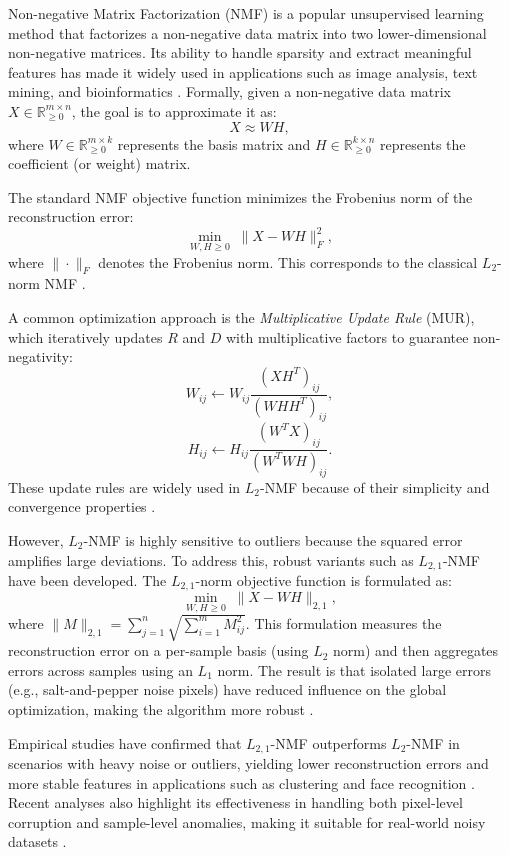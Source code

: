 
\noindent 

Non-negative Matrix Factorization (NMF) is a popular unsupervised learning method that factorizes a non-negative data matrix into two lower-dimensional non-negative matrices. Its ability to handle sparsity and extract meaningful features has made it widely used in applications such as image analysis, text mining, and bioinformatics \cite{diaz2021analysis}. Formally, given a non-negative data matrix $X \in \mathbb{R}^{m \times n}_{\ge 0}$, the goal is to approximate it as:
\begin{equation}
    X \approx WH,
\end{equation}
where $W \in \mathbb{R}^{m \times k}_{\ge 0}$ represents the basis matrix and $H \in \mathbb{R}^{k \times n}_{\ge 0}$ represents the coefficient (or weight) matrix. 

The standard NMF objective function minimizes the Frobenius norm of the reconstruction error:
\begin{equation}
    \min_{W, H \ge 0} \; \|X - WH\|_{F}^{2}, \label{eq.standred NMF}
\end{equation}
where $\|\cdot\|_{F}$ denotes the Frobenius norm. This corresponds to the classical $L_2$-norm NMF \cite{kang2023robustness}.

A common optimization approach is the \textit{Multiplicative Update Rule} (MUR), which iteratively updates $R$ and $D$ with multiplicative factors to guarantee non-negativity:
\begin{equation}
    W_{ij} \leftarrow W_{ij} \frac{(XH^{T})_{ij}}{(WHH^{T})_{ij}}, 
\end{equation}
\begin{equation}
    H_{ij} \leftarrow H_{ij} \frac{(W^{T}X)_{ij}}{(W^{T}WH)_{ij}}.
\end{equation}
These update rules are widely used in $L_2$-NMF because of their simplicity and convergence properties \cite{diaz2021analysis}.

However, $L_2$-NMF is highly sensitive to outliers because the squared error amplifies large deviations. To address this, robust variants such as $L_{2,1}$-NMF have been developed. The $L_{2,1}$-norm objective function is formulated as:
\begin{equation}
    \min_{W, H \ge 0} \; \|X - WH\|_{2,1},
\end{equation}
where $\|M\|_{2,1} = \sum_{j=1}^{n} \sqrt{\sum_{i=1}^{m} M_{ij}^{2}}$. This formulation measures the reconstruction error on a per-sample basis (using $L_2$ norm) and then aggregates errors across samples using an $L_1$ norm. The result is that isolated large errors (e.g., salt-and-pepper noise pixels) have reduced influence on the global optimization, making the algorithm more robust \cite{kong2011robust,lu2016projective}.

Empirical studies have confirmed that $L_{2,1}$-NMF outperforms $L_2$-NMF in scenarios with heavy noise or outliers, yielding lower reconstruction errors and more stable features in applications such as clustering and face recognition \cite{wu2018manifold,kang2023robustness}. Recent analyses also highlight its effectiveness in handling both pixel-level corruption and sample-level anomalies, making it suitable for real-world noisy datasets \cite{diaz2021analysis}.